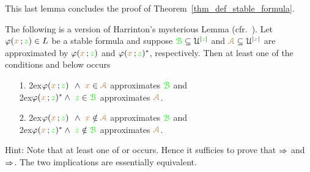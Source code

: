 \documentclass[creche.tex]{subfiles}
\begin{document}
This last lemma concludes the proof of Theorem~\ref{thm_def_stable_formula}. 


\begin{exercise}\label{ex_harrington}
\def\grB{{\gr{\EuScript B}}}
\def\mrA{{\mr{\EuScript A}}}
The following is a version of Harrinton's mysterious 
Lemma (cfr.~\cite[Lemma 8.3.4]{TZ}).
Let $\varphi({\color{brown} x}\,;{\color{green} z})\in L$ be a stable formula and suppose $\grB\subseteq\U^{|{\gr z}|}$ and $\mrA\subseteq\U^{|{\mr x}|}$ are approximated by $\varphi({\color{brown} x}\,;{\color{green} z})$ and  $\varphi({\color{brown} x}\,;{\color{green} z})^*$, respectively.
Then at least one of the conditions  and  below occurs

\begin{itemize}
\item[1.]
\kern2ex$\phi({\mr x}\,;{\gr z})^{\phantom{*}}\wedge\ {\mr x}\in{\mrA}$ approximates $\grB$ and\\
\kern2ex$\phi({\mr x}\,;{\gr z})^*\wedge\ {\gr z}\in{\grB}$ approximates $\mrA$.


\item[2.]
\kern2ex$\phi({\mr x}\,;{\gr z})^{\phantom{*}}\wedge\ {\mr x}\notin{\mrA}$ approximates $\grB$ and\\
\kern2ex$\phi({\mr x}\,;{\gr z})^*\wedge\ {\gr z}\notin{\grB}$ approximates $\mrA$.

\end{itemize}
Hint: Note that at least one of  or  occurs.
Hence it sufficies to prove that $\Rightarrow$ and $\Rightarrow$. The two implications are essentially equivalent.
% 
% 
% 
% 
% 
% 
% 
% 
% 
% 
\end{exercise}
\end{document}
